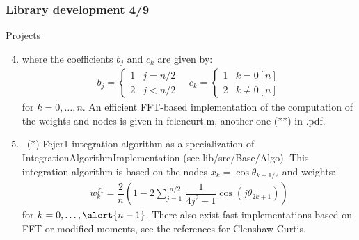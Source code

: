 \documentclass[8pt]{beamer}
\begin{document}
\begin{frame}
  \frametitle{Library development 4/9}
  \begin{block}{Projects}
    \begin{enumerate}
      \setcounter{enumi}{3}
      \item[] where the coefficients $b_j$ and $c_k$ are given by:
      \begin{align}
        b_j=\left\{\begin{array}{ll}
                     1 & j = n/2 \\
                     2 & j < n/2
                     \end{array}\right.\quad c_k=\left\{\begin{array}{ll}
                     1 & k = 0[n] \\
                     2 & k\neq 0[n]
                     \end{array}\right.
      \end{align}
      for $k=0,\dots,n$. An efficient FFT-based implementation of the computation of the weights and nodes is given in {\ttfamily fclencurt.m}, another one (**) in {.pdf}.
    \item~(*) \alert{\ttfamily Fejer1} integration algorithm as a specialization of  \alert{\ttfamily IntegrationAlgorithmImplementation} (see {\ttfamily lib/src/Base/Algo}). This integration algorithm is based on the nodes $x_k=\cos\theta_{k+1/2}$ and weights:
      \begin{align}
        w_k^{f1}=\dfrac{2}{n}\left(1-2\sum_{j=1}^{\lfloor n/2\rfloor}\dfrac{1}{4j^2-1}\cos\left(j\theta_{2k+1}\right)\right)
      \end{align}
      for $k=0,\dots,\alert{n-1}$. There also exist fast implementations based on FFT or modified moments, see the references for Clenshaw Curtis.
    \end{enumerate}
  \end{block}
\end{frame}
\end{document}
